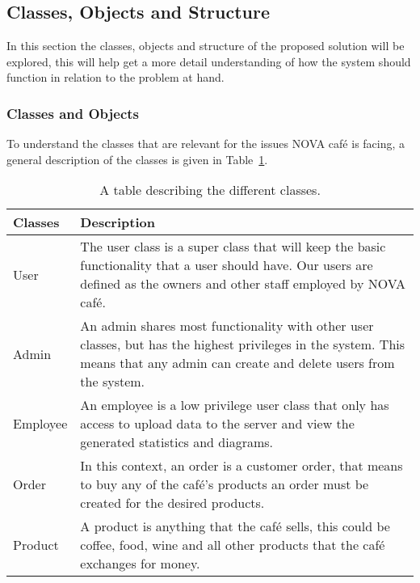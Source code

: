 \subsection{Classes, Objects and Structure}\label{subsec:classes-objects-and-structure}

In this section the classes, objects and structure of the proposed solution will be explored, this
will help get a more detail understanding of how the system should function in relation to the problem at hand.


\subsubsection{Classes and Objects}\label{subsubsec:classes-and-objects}
To understand the classes that are relevant for the issues NOVA café is facing,
a general description of the classes is given in Table~\ref{tab:class-table}.

\begin{table}[H]
    \centering
    \begin{tabular} { m{2.5cm} m{10cm} }
        \toprule
        \textbf{Classes} & \textbf{Description} \\
        \midrule
        User & The user class is a super class that will keep the
        basic functionality that a user should have.
        Our users are defined as the owners and other staff employed by NOVA café. \\
        \midrule
        Admin & An admin shares most functionality with other user classes,
        but has the highest privileges in the system.
        This means that any admin can create and delete users from the system. \\
        \midrule
        Employee & An employee is a low privilege user class
        that only has access to upload data to the server and
        view the generated statistics and diagrams. \\
        \midrule
        Order & In this context, an order is a customer order,
        that means to buy any of the café's products an order must be created
        for the desired products. \\
        \midrule
        Product & A product is anything that the café sells,
        this could be coffee, food, wine and all other products that
        the café exchanges for money. \\
        \bottomrule
    \end{tabular}
    \caption{A table describing the different classes.}\label{tab:class-table}
\end{table}

